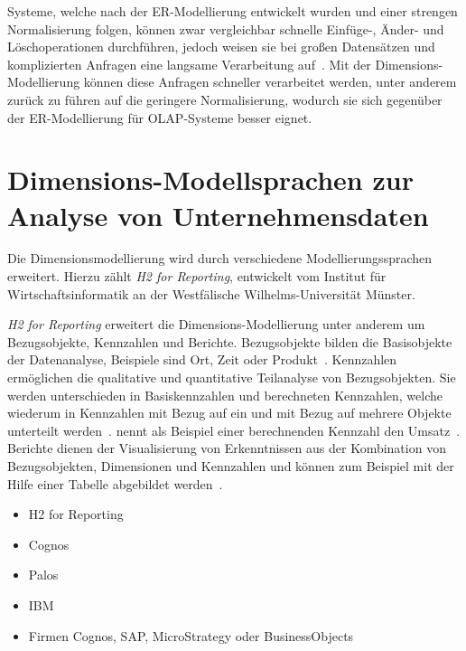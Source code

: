 \documentclass[
  language=german, %
  type=bachelor%
]{isthesis}
\begin{document}
\begin{content}
  Systeme, welche nach der ER-Modellierung entwickelt wurden und einer strengen
  Normalisierung folgen, können zwar vergleichbar schnelle Einfüge-, Änder- und
  Löschoperationen durchführen, jedoch weisen sie bei großen Datensätzen und
  komplizierten Anfragen eine langsame Verarbeitung auf~\cite[][S.
  52]{ballard2012dimensional}. Mit der Dimensions-Modellierung können diese
  Anfragen schneller verarbeitet werden\cite[][S.  52]{ballard2012dimensional},
  unter anderem zurück zu führen auf die geringere Normalisierung, wodurch sie
  sich gegenüber der ER-Modellierung für \acrshort{OLAP}-Systeme besser eignet.


  \section{Dimensions-Modellsprachen zur Analyse von Unternehmensdaten}
  Die Dimensionsmodellierung wird durch verschiedene Modellierungssprachen
  erweitert. Hierzu zählt \zB{} \textit{H2 for Reporting}, entwickelt vom
  Institut für Wirtschaftsinformatik an der Westfälische Wilhelms-Universität
  Münster.
  
  \textit{H2 for Reporting} erweitert die Dimensions-Modellierung unter anderem
  um Bezugsobjekte, Kennzahlen und Berichte. Bezugsobjekte bilden die
  Basisobjekte der Datenanalyse, Beispiele sind Ort, Zeit oder
  Produkt~\cite[][S.  5]{becker2007h2}. Kennzahlen ermöglichen die qualitative
  und quantitative Teilanalyse von Bezugsobjekten. Sie werden unterschieden in
  Basiskennzahlen und berechneten Kennzahlen, welche wiederum in Kennzahlen mit
  Bezug auf ein und mit Bezug auf mehrere Objekte unterteilt werden~\cite[][S.
  15]{becker2007h2}. \textsc{\citeauthor{becker2007h2}} nennt als Beispiel
  einer berechnenden Kennzahl den Umsatz~\cite[][S. 17]{becker2007h2}.
  Berichte dienen der Visualisierung von Erkenntnissen aus der Kombination von
  Bezugsobjekten, Dimensionen und Kennzahlen und können zum Beispiel mit der
  Hilfe einer Tabelle abgebildet werden~\cite[][S. 23]{becker2007h2}.

  \begin{itemize}
    \item H2 for Reporting
    \item Cognos
    \item Palos
    \item IBM
    \item Firmen Cognos, SAP, MicroStrategy oder BusinessObjects
  \end{itemize}


\end{content}
\end{document}
